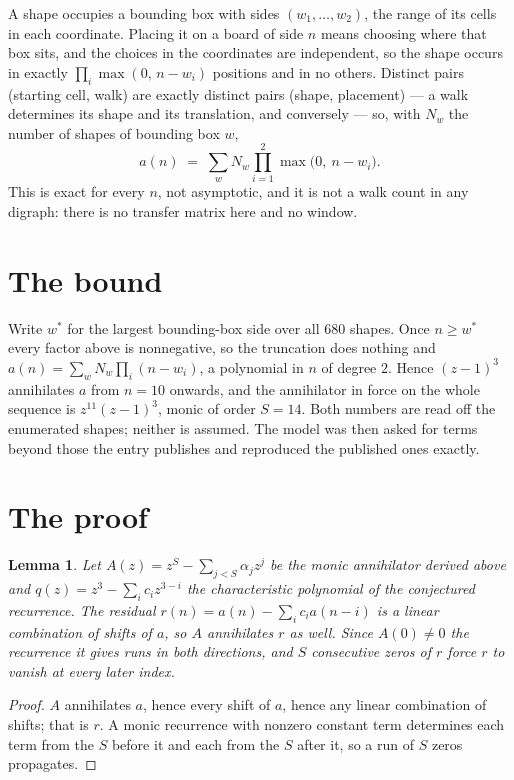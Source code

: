 \documentclass[11pt,a4paper]{article}
\theoremstyle{plain}
\newtheorem{lemma}[theorem]{Lemma}
\theoremstyle{definition}
\begin{document}
A shape occupies a bounding box with sides $(w_1,\dots,w_{2})$, the range of its cells in each
coordinate. Placing it on a board of side $n$ means choosing where that box sits, and the
choices in the coordinates are independent, so the shape occurs in exactly
$\prod_{i}\max(0,\,n-w_i)$ positions and in no others. Distinct pairs (starting cell,
walk) are exactly distinct pairs (shape, placement) --- a walk determines its shape and its
translation, and conversely --- so, with $N_w$ the number of shapes of bounding box $w$,
\[
a(n)\;=\;\sum_{w} N_w \prod_{i=1}^{2}\max\bigl(0,\ n-w_i\bigr).
\]
This is exact for every $n$, not asymptotic, and it is not a walk count in any digraph: there is
no transfer matrix here and no window.

\section{The bound}

Write $w^\ast$ for the largest bounding-box side over all $680$ shapes. Once $n\ge w^\ast$
every factor above is nonnegative, so the truncation does nothing and
$a(n)=\sum_w N_w\prod_i(n-w_i)$, a polynomial in $n$ of degree $2$. Hence $(z-1)^{3}$
annihilates $a$ from $n=10$ onwards, and the annihilator in force on the whole sequence is
$z^{11}(z-1)^{3}$, monic of order $S=14$. Both numbers are read off the enumerated
shapes; neither is assumed. The model was then asked for terms beyond those the entry publishes
and reproduced the published ones exactly.

\section{The proof}

\begin{lemma}\label{lem:crit}
Let $A(z)=z^S-\sum_{j<S}\alpha_jz^{j}$ be the monic annihilator derived above and
$q(z)=z^{3}-\sum_ic_iz^{3-i}$ the characteristic polynomial of the conjectured
recurrence. The residual $r(n)=a(n)-\sum_ic_ia(n-i)$ is a linear combination of shifts of $a$,
so $A$ annihilates $r$ as well. Since $A(0)\ne0$ the recurrence it gives runs in both
directions, and $S$ consecutive zeros of $r$ force $r$ to vanish at every later index.
\end{lemma}

\begin{proof}
$A$ annihilates $a$, hence every shift of $a$, hence any linear combination of shifts; that is
$r$. A monic recurrence with nonzero constant term determines each term from the $S$ before it
and each from the $S$ after it, so a run of $S$ zeros propagates.
\end{proof}
\end{document}
